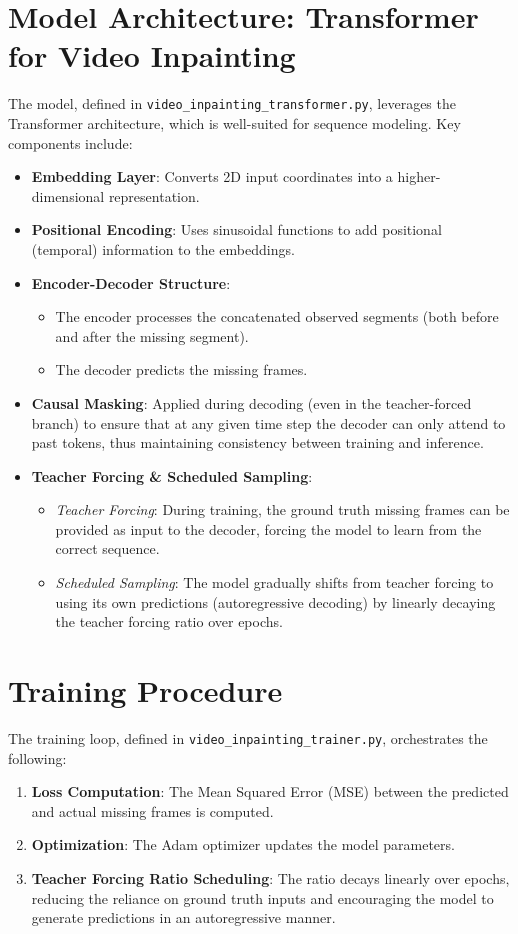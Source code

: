 \documentclass{article}
\begin{document}
\section{Model Architecture: Transformer for Video Inpainting}
The model, defined in \texttt{video\_inpainting\_transformer.py}, leverages the Transformer architecture, which is well-suited for sequence modeling. Key components include:
\begin{itemize}
    \item \textbf{Embedding Layer}: Converts 2D input coordinates into a higher-dimensional representation.
    \item \textbf{Positional Encoding}: Uses sinusoidal functions to add positional (temporal) information to the embeddings.
    \item \textbf{Encoder-Decoder Structure}: 
    \begin{itemize}
        \item The encoder processes the concatenated observed segments (both before and after the missing segment).
        \item The decoder predicts the missing frames.
    \end{itemize}
    \item \textbf{Causal Masking}: Applied during decoding (even in the teacher-forced branch) to ensure that at any given time step the decoder can only attend to past tokens, thus maintaining consistency between training and inference.
    \item \textbf{Teacher Forcing \& Scheduled Sampling}: 
    \begin{itemize}
        \item \emph{Teacher Forcing}: During training, the ground truth missing frames can be provided as input to the decoder, forcing the model to learn from the correct sequence.
        \item \emph{Scheduled Sampling}: The model gradually shifts from teacher forcing to using its own predictions (autoregressive decoding) by linearly decaying the teacher forcing ratio over epochs.
    \end{itemize}
\end{itemize}

\section{Training Procedure}
The training loop, defined in \texttt{video\_inpainting\_trainer.py}, orchestrates the following:
\begin{enumerate}
    \item \textbf{Loss Computation}: The Mean Squared Error (MSE) between the predicted and actual missing frames is computed.
    \item \textbf{Optimization}: The Adam optimizer updates the model parameters.
    \item \textbf{Teacher Forcing Ratio Scheduling}: The ratio decays linearly over epochs, reducing the reliance on ground truth inputs and encouraging the model to generate predictions in an autoregressive manner.
\end{enumerate}
\end{document}
